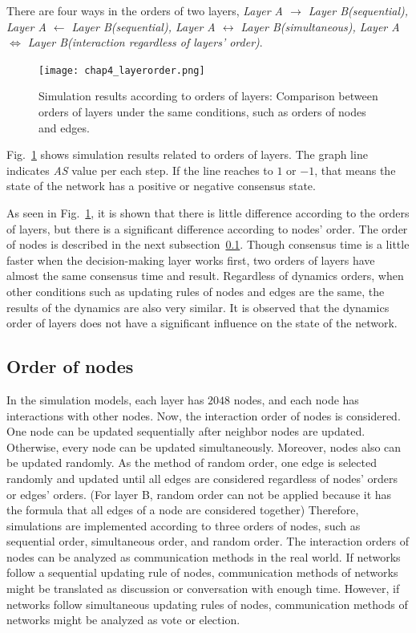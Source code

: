 There are four ways in the orders of two layers, \textit{Layer A $\to$ Layer B(sequential), Layer A $\leftarrow$ Layer B(sequential), Layer A $\leftrightarrow$ Layer B(simultaneous), Layer A $\Leftrightarrow$ Layer B(interaction regardless of layers' order)}. 

\begin{figure}[!htb]
	\centering
	\texttt{[image: chap4\_layerorder.png]}
	\caption{Simulation results according to orders of layers: Comparison between orders of layers under the same conditions, such as orders of nodes and edges.}
	\label{chap4_layerorder}
\end{figure}

Fig.~\ref{chap4_layerorder} shows simulation results related to orders of layers. The graph line indicates \textit{AS} value per each step. If the line reaches to $1$ or $-1$, that means the state of the network has a positive or negative consensus state.

As seen in Fig.~\ref{chap4_layerorder}, it is shown that there is little difference according to the orders of layers, but there is a significant difference according to nodes' order. The order of nodes is described in the next subsection~\ref{order of node}. Though consensus time is a little faster when the decision-making layer works first, two orders of layers have almost the same consensus time and result. Regardless of dynamics orders, when other conditions such as updating rules of nodes and edges are the same, the results of the dynamics are also very similar. It is observed that the dynamics order of layers does not have a significant influence on the state of the network. \\

\subsection{Order of nodes}
\label{order of node}
In the simulation models, each layer has $2048$ nodes, and each node has interactions with other nodes. Now, the interaction order of nodes is considered. One node can be updated sequentially after neighbor nodes are updated. Otherwise, every node can be updated simultaneously. Moreover, nodes also can be updated randomly. As the method of random order, one edge is selected randomly and updated until all edges are considered regardless of nodes' orders or edges' orders. (For layer B, random order can not be applied because it has the formula that all edges of a node are considered together) Therefore, simulations are implemented according to three orders of nodes, such as sequential order, simultaneous order, and random order. The interaction orders of nodes can be analyzed as communication methods in the real world. If networks follow a sequential updating rule of nodes, communication methods of networks might be translated as discussion or conversation with enough time. However, if networks follow simultaneous updating rules of nodes, communication methods of networks might be analyzed as vote or election.

